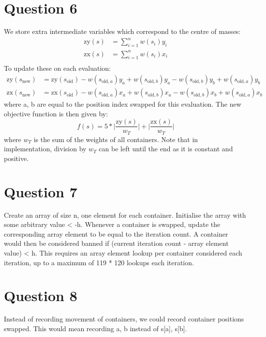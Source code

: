 \documentclass[10pt,a4paper]{article}
\begin{document}
\section*{Question 6}
We store extra intermediate variables which correspond to the centre of masses:
\begin{align*}
\text{zy}(s) &= \sum^n_{i=1} w(s_i)y_i\\
\text{zx}(s) &= \sum^n_{i=1} w(s_i)x_i\\
\end{align*}
To update these on each evaluation:
\begin{align*}
\text{zy}(s_\text{new}) &= \text{zy}(s_\text{old}) - w(s_{\text{old}, a})y_a + w(s_{\text{old}, b})y_a - w(s_{\text{old}, b})y_b + w(s_{\text{old}, a})y_b \\
\text{zx}(s_\text{new}) &= \text{zx}(s_\text{old}) - w(s_{\text{old}, a})x_a + w(s_{\text{old}, b})x_a - w(s_{\text{old}, b})x_b + w(s_{\text{old}, a})x_b
\end{align*}
where a, b are equal to the position index swapped for this evaluation. The new objective function is then given by:
\begin{equation*}
f(s) = 5 * \bigg| \frac{\text{zy}(s)}{w_T} \bigg| + \bigg| \frac{\text{zx}(s)}{w_T} \bigg|
\end{equation*}
where \(w_T\) is the sum of the weights of all containers. Note that in implementation, division by \(w_T\) can be left until the end as it is constant and positive.

\section*{Question 7}
Create an array of size n, one element for each container. Initialise the array with some arbitrary value < -h. Whenever a container is swapped, update the corresponding array element to be equal to the iteration count. A container would then be considered banned if (current iteration count - array element value) < h. This requires an array element lookup per container considered each iteration, up to a maximum of 119 * 120 lookups each iteration.

\section*{Question 8}
Instead of recording movement of containers, we could record container positions swapped. This would mean recording a, b instead of s[a], s[b].
\end{document}
